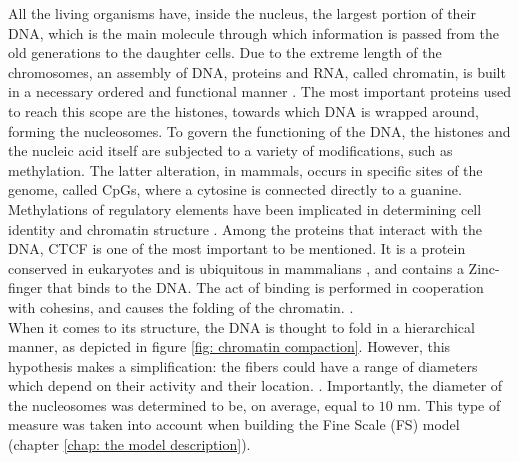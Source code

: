 All the living organisms have, inside the nucleus, the largest portion of their DNA, which is the main molecule through which information is passed from the old generations to the daughter cells. Due to the extreme length of the chromosomes, an assembly of DNA, proteins and RNA, called chromatin, is built in a necessary ordered and functional manner
\cite{paroBiologyChromatin2021}. 
The most important proteins used to reach this scope are the histones, towards which DNA is wrapped around, forming the nucleosomes. To govern the functioning of the DNA, the histones and the nucleic acid itself are subjected to a variety of modifications, such as methylation. The latter alteration, in mammals, occurs in specific sites of the genome, called CpGs, where a cytosine is connected directly to a guanine. Methylations of regulatory elements have been implicated in determining cell identity and chromatin structure
\cite{liauAdaptiveChromatinRemodeling2017, shareefExtendedrepresentationBisulfiteSequencing2021}. 
Among the proteins that interact with the DNA, CTCF is one of the most important to be mentioned. It is a protein conserved in eukaryotes and is ubiquitous in mammalians
\cite{kimCTCFMultifunctionalProtein2015a}, 
and contains a Zinc-finger that binds to the DNA. The act of binding is performed in cooperation with cohesins, and causes the folding of the chromatin.
\cite{hsiehEnhancerPromoterInteractions2022,kimCTCFMultifunctionalProtein2015a}.\\

When it comes to its structure, the DNA is thought to fold in a hierarchical manner, as depicted in figure \ref{fig: chromatin compaction}.
However, this hypothesis makes a simplification: the fibers could have a range of diameters which depend on their activity and their location.
\cite{ouChromEMTVisualizing3D2017a,robinsonEMMeasurementsDefine2006}.
Importantly, the diameter of the nucleosomes was determined to be, on average, equal to $10$ nm. This type of measure was taken into account when building the Fine Scale (FS) model (chapter \ref{chap: the model description}).
